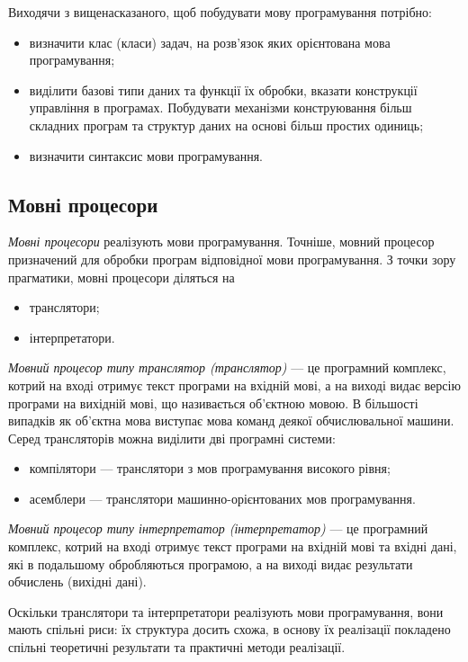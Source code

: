 Виходячи з вищенасказаного, щоб побудувати мову програмування потрібно:
\begin{itemize}
	\item визначити клас (класи) задач, на розв'язок яких орієнтована мова 
	програмування;
	\item виділити базові типи даних та функції їх обробки, вказати конструкції
	управління в програмах. Побудувати механізми конструювання більш складних
	програм та структур даних на основі більш простих одиниць;
	\item визначити синтаксис мови програмування.
\end{itemize}

\subsection{Мовні процесори}

\textit{Мовні процесори} реалізують мови програмування. Точніше, мовний
процесор призначений для обробки програм відповідної мови програмування. З
точки зору прагматики, мовні процесори діляться на
\begin{itemize}
	\item транслятори;
	\item інтерпретатори.
\end{itemize}

\textit{Мовний процесор типу транслятор (транслятор)} --- це програмний
комплекс, котрий на вході отримує текст програми на вхідній мові, а на виході
видає версію програми на вихідній мові, що називається об'єктною мовою. В
більшості випадків як об'єктна мова виступає мова команд деякої обчислювальної
машини. Серед трансляторів можна виділити дві програмні системи:
\begin{itemize}
	\item компілятори --- транслятори з мов програмування високого рівня;
	\item асемблери --- транслятори машинно-орієнтованих мов програмування.
\end{itemize}

\textit{Мовний процесор типу інтерпретатор (інтерпретатор)} --- це програмний
комплекс, котрий на вході отримує текст програми на вхідній мові та вхідні дані,
які в подальшому обробляються програмою, а на виході видає результати
обчислень (вихідні дані). \medskip

Оскільки транслятори та інтерпретатори реалізують мови програмування,
вони мають спільні риси: їх структура досить схожа, в основу їх реалізації
покладено спільні теоретичні результати та практичні методи реалізації.

